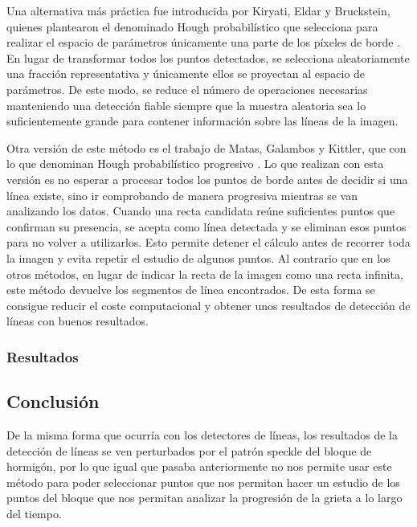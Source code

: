 Una alternativa más práctica fue introducida por Kiryati, Eldar y Bruckstein, quienes plantearon el denominado Hough probabilístico que selecciona para realizar el espacio de parámetros únicamente una parte de los píxeles de borde \cite{kiryati1991pht}. En lugar de transformar todos los puntos detectados, se selecciona aleatoriamente una fracción representativa y únicamente ellos se proyectan al espacio de parámetros. De este modo, se reduce el número de operaciones necesarias manteniendo una detección fiable siempre que la muestra aleatoria sea lo suficientemente grande para contener información sobre las líneas de la imagen.  

Otra versión de este método es el trabajo de Matas, Galambos y Kittler, que con lo que denominan Hough probabilístico progresivo \cite{matas2000ppht}. Lo que realizan con esta versión es no esperar a procesar todos los puntos de borde antes de decidir si una línea existe, sino ir comprobando de manera progresiva mientras se van analizando los datos. Cuando una recta candidata reúne suficientes puntos que confirman su presencia, se acepta como línea detectada y se eliminan esos puntos para no volver a utilizarlos. Esto permite detener el cálculo antes de recorrer toda la imagen y evita repetir el estudio de algunos puntos. Al contrario que en los otros métodos, en lugar de indicar la recta de la imagen como una recta infinita, este método devuelve los segmentos de línea encontrados. De esta forma se consigue reducir el coste computacional y obtener unos resultados de detección de líneas con buenos resultados.

\subsubsection{Resultados}


\subsection{Conclusión}
De la misma forma que ocurría con los detectores de líneas, los resultados de la detección de líneas se ven perturbados por el patrón speckle del bloque de hormigón, por lo que igual que pasaba anteriormente no nos permite usar este método para poder seleccionar puntos que nos permitan hacer un estudio de los puntos del bloque que nos permitan analizar la progresión de la grieta a lo largo del tiempo.


